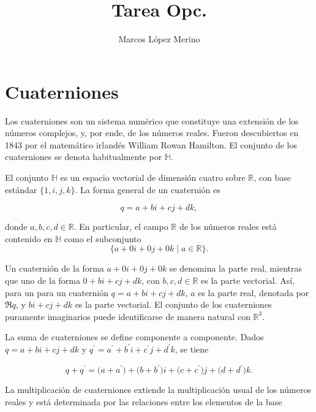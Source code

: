 \documentclass{fc-hw-template}
\title{Tarea Opc.}
\author{Marcos López Merino}
\begin{document}
\maketitle

\section*{Cuaterniones}

Los cuaterniones son un sistema numérico que constituye una extensión de los números complejos, y, por ende, de los números reales. Fueron descubiertos en 1843 por el matemático irlandés William Rowan Hamilton. El conjunto de los cuaterniones se denota habitualmente por \(\mathbb{H}\).

El conjunto \(\mathbb{H}\) es un espacio vectorial de dimensión cuatro sobre \(\mathbb{R}\),
con base estándar \(\bigl\lbrace 1, i, j, k \bigr\rbrace\). La forma general de
un cuaternión es

\begin{equation*}
	q = a + bi + cj + dk,
\end{equation*}

donde \( a, b, c, d\in\mathbb{R}\). En particular, el campo \(\mathbb{R}\) de los
números reales está contenido en \(\mathbb{H}\) como el subconjunto
\begin{equation*}
	\bigl\lbrace a + 0i + 0j + 0k \mid a\in\mathbb{R} \bigr\rbrace.
\end{equation*}

Un cuaternión de la forma \(a + 0i + 0j + 0k\) se denomina la parte real, mientras que
uno de la forma \(0 + bi + cj + dk\), con \( b, c,d\in\mathbb{R}\) es la parte
vectorial. Así, para un para un cuaternión \(q = a + bi + cj + dk \), \(a\) es la parte
real, denotada por \(\Re{q}\), y \(bi + cj + dk \) es la parte vectorial. El conjunto de
los cuaterniones puramente imaginarios puede identificarse de manera natural con
\(\mathbb{R}^{3}\).

La suma de cuaterniones se define componente a componente. Dados \(q = a + bi + cj + dk\) y \(q^{\prime} = a^{\prime} + b^{\prime}i + c^{\prime}j + d^{\prime}k\), se tiene

\begin{equation*}
	q + q^{\prime} = \bigl(a + a^{\prime}\bigr) + \bigl(b + b^{\prime}\bigr)i + \bigl(c + c^{\prime}\bigr)j + \bigl(d + d^{\prime}\bigr)k.
\end{equation*}

La multiplicación de cuaterniones extiende la multiplicación usual de los números reales
y está determinada por las relaciones entre los elementos de la base
\end{document}
